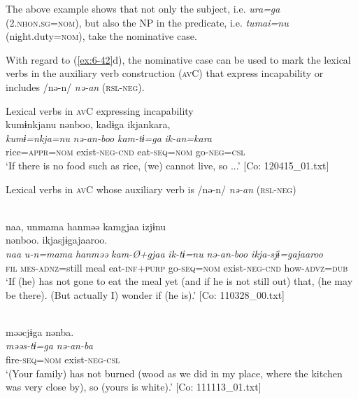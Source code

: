 The above example shows that not only the subject, i.e. \textit{ura=ga} (2.\textsc{nhon}.\textsc{sg}=\textsc{nom}), but also the NP in the predicate, i.e. \textit{tumai=nu} (night.duty=\textsc{nom}), take the nominative case.

  With regard to (\ref{ex:6-42}d), the nominative case can be used to mark the lexical verbs in the auxiliary verb construction (\textsc{av}C) that express incapability or includes /nə-n/ \textit{nə-an} (\textsc{rsl}-\textsc{neg}).

\ea\label{ex:6-48}
 Lexical verbs in \textsc{av}C expressing incapability\\

 \ea
 {\TM}
\glll kumɨnkjanu  nənboo,  kadɨga  ikjankara,\\
\textit{kumɨ=nkja=nu}  \textit{nə-an-boo}  \textit{kam-tɨ=ga}  \textit{ik-an=kara}\\
rice=\textsc{appr}=\textsc{nom}  exist-\textsc{neg}-\textsc{cnd}  eat-\textsc{seq}=\textsc{nom}  go-\textsc{neg}=\textsc{csl}\\
\glt ‘If there is no food such as rice, (we) cannot live, so ...’ [Co: 120415\_01.txt]

  Lexical verbs in \textsc{av}C whose auxiliary verb is /nə-n/ \textit{nə-an} (\textsc{rsl}-\textsc{neg})

\ex{}\\
{\TM}
\glll  naa,  unmama  hanməə  kamgjaa  izjɨnu\\                                                                                        nənboo.  ikjasjɨgajaaroo.\\
      \textit{naa}  \textit{u-n=mama}  \textit{hanməə}  \textit{kam-Ø+gjaa}  \textit{ik-tɨ=nu}                                        \textit{nə-an-boo  ikja-sjɨ=gajaaroo}\\
      \textsc{fil}  \textsc{mes}-\textsc{adnz}=still  meal  eat-\textsc{inf}+\textsc{purp}  go-\textsc{seq}=\textsc{nom}              exist-\textsc{neg}-\textsc{cnd}  how-\textsc{advz}=\textsc{dub}\\
\glt ‘If (he) has not gone to eat the meal yet (and if he is not still out) that, (he may be there). (But actually I) wonder if (he is).’ [Co: 110328\_00.txt]

\ex{}\\
{\TM}
\glll  məəcjɨga  nənba.\\
\textit{məəs-tɨ=ga}  \textit{nə-an-ba}\\
fire-\textsc{seq}=\textsc{nom}  exist-\textsc{neg}-\textsc{csl}\\
\glt ‘(Your family) has not burned (wood as we did in my place, where the kitchen was very close by), so (yours is white).’ [Co: 111113\_01.txt]
\z
\z

